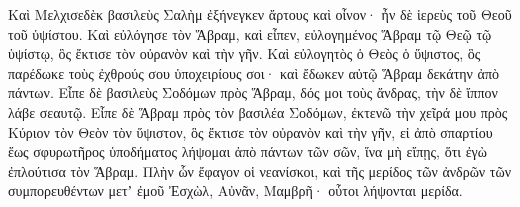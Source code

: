 {\par }{\PP {}Καὶ Μελχισεδὲκ βασιλεὺς Σαλὴμ ἐξήνεγκεν ἄρτους καὶ οἶνον· ἦν δὲ ἱερεὺς τοῦ Θεοῦ τοῦ ὑψίστου.
Καὶ εὐλόγησε τὸν Ἅβραμ, καὶ εἶπεν, εὐλογημένος Ἅβραμ τῷ Θεῷ τῷ ὑψίστῳ, ὃς ἔκτισε τὸν οὐρανὸν καὶ τὴν γῆν.
Καὶ εὐλογητὸς ὁ Θεὸς ὁ ὕψιστος, ὃς παρέδωκε τοὺς ἐχθρούς σου ὑποχειρίους σοι· καὶ ἔδωκεν αὐτῷ Ἅβραμ δεκάτην ἀπὸ πάντων.
Εἶπε δὲ βασιλεὺς Σοδόμων πρὸς Ἅβραμ, δός μοι τοὺς ἄνδρας, τὴν δὲ ἵππον λάβε σεαυτῷ.
Εἶπε δὲ Ἅβραμ πρὸς τὸν βασιλέα Σοδόμων, ἐκτενῶ τὴν χεῖρά μου πρὸς Κύριον τὸν Θεὸν τὸν ὕψιστον, ὃς ἔκτισε τὸν οὐρανὸν καὶ τὴν γῆν,
εἰ ἀπὸ σπαρτίου ἕως σφυρωτῆρος ὑποδήματος λήψομαι ἀπὸ πάντων τῶν σῶν, ἵνα μὴ εἴπῃς, ὅτι ἐγὼ ἐπλούτισα τὸν Ἅβραμ.
Πλὴν ὧν ἔφαγον οἱ νεανίσκοι, καὶ τῆς μερίδος τῶν ἀνδρῶν τῶν συμπορευθέντων μετʼ ἐμοῦ Ἐσχὼλ, Αὐνᾶν, Μαμβρῆ· οὗτοι λήψονται μερίδα.

}
